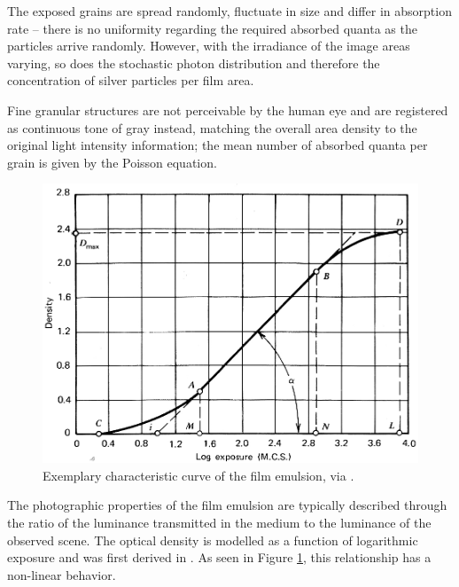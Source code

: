 The exposed grains are spread randomly, fluctuate in size and differ in absorption rate -- there is no uniformity regarding the required absorbed quanta as the particles arrive randomly. However, with the irradiance of the image areas varying, so does the stochastic photon distribution and therefore the concentration of silver particles per film area. 

Fine granular structures are not perceivable by the human eye and are registered as continuous tone of gray \cite{Feng_Yang_2012} instead, matching the overall area density to the original light intensity information; the mean number of absorbed quanta per grain is given by the Poisson equation. %


\begin{figure}[h]
  \centering
  \includegraphics[width=\linewidth]{imgs/film/filmcurve.jpg}
  \caption{Exemplary characteristic curve of the film emulsion, via \cite{Saleh1991}.}
  \label{fig:filmcurve}
\end{figure}
The photographic properties of the film emulsion are typically described through the ratio of the luminance transmitted in the medium to the luminance of the observed scene. The optical density is modelled as a function of logarithmic exposure and was first derived in \cite{HurterDriffield}. As seen in Figure \ref{fig:filmcurve}, this relationship has a non-linear behavior. 


